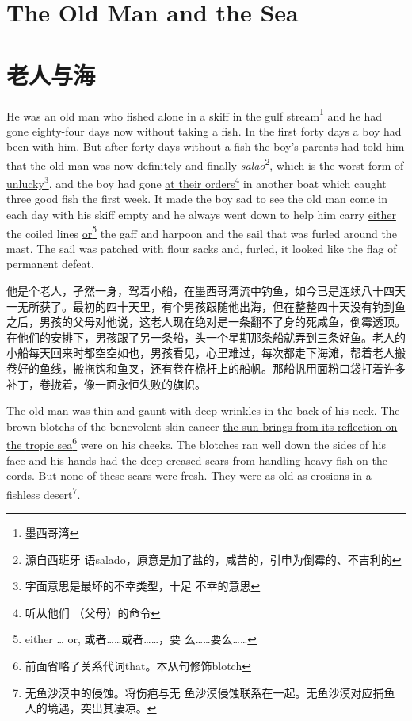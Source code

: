 \begin{paracol}{2}
\chapter{The Old Man and the Sea}

\switchcolumn

\chapter*{老人与海}

\switchcolumn*

He was an old man who fished alone in a \gls{skiff} in \uline{the \Gls{gulf}
  \Gls{stream}}\footnote{墨西哥湾} and he had gone eighty-four days now without
taking a fish. In the first forty days a boy had been with him. But after
forty days without a fish the boy's parents had told him that the old man
was now \gls{definitely} and finally \emph{salao}\footnote{源自西班牙
  语salado，原意是加了盐的，咸苦的，引申为倒霉的、不吉利的}, which is
\uline{the worst \gls{form} of unlucky}\footnote{字面意思是最坏的不幸类型，十足
  不幸的意思}, and the boy had gone \uline{at their orders}\footnote{听从他们
  （父母）的命令} in another boat which caught three good fish the first
week. It made the boy sad to see the old man come in each day with his
skiff empty and he always went down to help him carry \uline{either} the
\gls{coiled} lines \uline{or}\footnote{either \ldots{} or, 或者……或者……，要
  么……要么……} the \gls{gaff} and \gls{harpoon} and the \gls{sail} that was
\gls{furled} around the \gls{mast}. The sail was patched with \gls{flour}
\glspl{sack} and, \gls{furled}, it looked like the flag of \gls{permanent} \gls{defeat}.

\switchcolumn

他是个老人，孑然一身，驾着小船，在墨西哥湾流中钓鱼，如今已是连续八十四天一无所获了。最初的四十天里，有个男孩跟随他出海，但在整整四十天没有钓到鱼之后，男孩的父母对他说，这老人现在绝对是一条翻不了身的死咸鱼，倒霉透顶。在他们的安排下，男孩跟了另一条船，头一个星期那条船就弄到三条好鱼。老人的小船每天回来时都空空如也，男孩看见，心里难过，每次都走下海滩，帮着老人搬卷好的鱼线，搬拖钩和鱼叉，还有卷在桅杆上的船帆。那船帆用面粉口袋打着许多补丁，卷拢着，像一面永恒失败的旗帜。

\switchcolumn*

The old man was thin and \gls{gaunt} with deep \glspl{wrinkle} in the back
of his neck. The brown \glspl{blotch} of the \gls{benevolent} \gls{skin}
cancer \uline{the sun \glspl{bring} from its \gls{reflection} on the
  \gls{tropic} sea}\footnote{前面省略了关系代词that。本从句修饰blotch} were
on his \glspl{cheek}. The blotches ran well down the sides of his face and his
hands had the \gls{deep-creased} \glspl{scar} from handling heavy fish on
the \glspl{cord}. But none of these scars were fresh. They were \gls{as} old
as \glspl{erosion} in a fishless desert\footnote{无鱼沙漠中的侵蚀。将伤疤与无
  鱼沙漠侵蚀联系在一起。无鱼沙漠对应捕鱼人的境遇，突出其凄凉。}.


\end{paracol}

